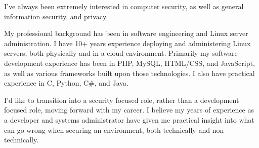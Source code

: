 

\begin{cvparagraph}

I've always been extremely interested in computer security, as well as general information security, and privacy.

My professional background has been in software engineering and Linux server administration. I have 10+ years experience deploying and administering Linux servers, both physically and in a cloud environment. Primarily my software development experience has been in PHP, MySQL, HTML/CSS, and JavaScript, as well as various frameworks built upon those technologies. I also have practical experience in C, Python, C\#, and Java. 

I'd like to transition into a security focused role, rather than a development focused role, moving forward with my career. I believe my years of experience as a developer and systems administrator have given me practical insight into what can go wrong when securing an environment, both technically and non-technically. 


\end{cvparagraph}
